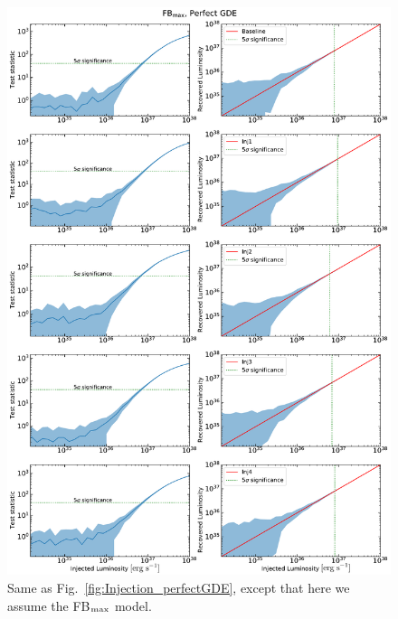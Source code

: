 \documentclass[doublespace,draft,nopageskip]{VTthesis} %
\begin{document}
\begin{figure}
    \begin{center}
    \includegraphics[scale = 0.42]{Figures/CTA/all-TS-mis-False-Fermi-min-False.pdf}
    \caption{Same as Fig.~\ref{fig:Injection_perfectGDE}, except that here we assume the FB$_{\rm max}$ model.}\label{fig:Injection_perfectGDEFBmax}
    \end{center}
\end{figure}
\end{document}
